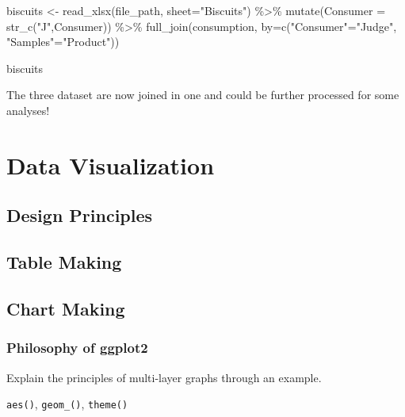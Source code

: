\documentclass[
]{book}
\newenvironment{Shaded}{\begin{snugshade}}{\end{snugshade}}
\newcommand{\AttributeTok}[1]{\textcolor[rgb]{0.77,0.63,0.00}{#1}}
\newcommand{\FunctionTok}[1]{\textcolor[rgb]{0.00,0.00,0.00}{#1}}
\newcommand{\NormalTok}[1]{#1}
\newcommand{\OtherTok}[1]{\textcolor[rgb]{0.56,0.35,0.01}{#1}}
\newcommand{\SpecialCharTok}[1]{\textcolor[rgb]{0.00,0.00,0.00}{#1}}
\newcommand{\StringTok}[1]{\textcolor[rgb]{0.31,0.60,0.02}{#1}}
\begin{document}
\begin{Shaded}
\begin{Highlighting}[]
\NormalTok{biscuits }\OtherTok{\textless{}{-}} \FunctionTok{read\_xlsx}\NormalTok{(file\_path, }\AttributeTok{sheet=}\StringTok{"Biscuits"}\NormalTok{) }\SpecialCharTok{\%\textgreater{}\%} 
  \FunctionTok{mutate}\NormalTok{(}\AttributeTok{Consumer =} \FunctionTok{str\_c}\NormalTok{(}\StringTok{"J"}\NormalTok{,Consumer)) }\SpecialCharTok{\%\textgreater{}\%} 
  \FunctionTok{full\_join}\NormalTok{(consumption, }\AttributeTok{by=}\FunctionTok{c}\NormalTok{(}\StringTok{"Consumer"}\OtherTok{=}\StringTok{"Judge"}\NormalTok{, }\StringTok{"Samples"}\OtherTok{=}\StringTok{"Product"}\NormalTok{))}

\NormalTok{biscuits}
\end{Highlighting}
\end{Shaded}

The three dataset are now joined in one and could be further processed for some analyses!

\hypertarget{data-viz}{%
\chapter{Data Visualization}\label{data-viz}}

\hypertarget{design-principles}{%
\section{Design Principles}\label{design-principles}}

\hypertarget{table-making}{%
\section{Table Making}\label{table-making}}

\hypertarget{chart-making}{%
\section{Chart Making}\label{chart-making}}

\hypertarget{philosophy-of-ggplot2}{%
\subsection{Philosophy of ggplot2}\label{philosophy-of-ggplot2}}

Explain the principles of multi-layer graphs through an example.

\texttt{aes()}, \texttt{geom\_()}, \texttt{theme()}
\end{document}

